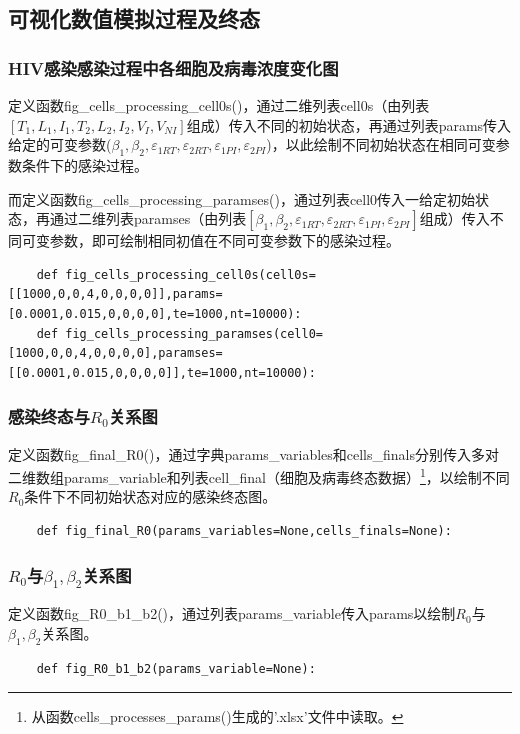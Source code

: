 \documentclass{ctexart}
\begin{document}
\subsection{可视化数值模拟过程及终态}
\subsubsection{HIV感染感染过程中各细胞及病毒浓度变化图}
定义函数fig\_cells\_processing\_cell0s()，通过二维列表cell0s（由列表$[T_{1},L_{1},I_{1},T_{2},L_{2},I_{2},V_{I},V_{NI}]$组成）传入不同的初始状态，再通过列表params传入给定的可变参数($\beta_{1},\beta_{2},\varepsilon _{1RT},\varepsilon _{2RT},\varepsilon _{1PI},\varepsilon _{2PI}$)，以此绘制不同初始状态在相同可变参数条件下的感染过程。

而定义函数fig\_cells\_processing\_paramses()，通过列表cell0传入一给定初始状态，再通过二维列表paramses（由列表$[\beta_{1},\beta_{2},\varepsilon _{1RT},\varepsilon _{2RT},\varepsilon _{1PI},\varepsilon _{2PI}]$组成）传入不同可变参数，即可绘制相同初值在不同可变参数下的感染过程。
\begin{lstlisting}
    def fig_cells_processing_cell0s(cell0s=[[1000,0,0,4,0,0,0,0]],params=[0.0001,0.015,0,0,0,0],te=1000,nt=10000):
    def fig_cells_processing_paramses(cell0=[1000,0,0,4,0,0,0,0],paramses=[[0.0001,0.015,0,0,0,0]],te=1000,nt=10000):
\end{lstlisting}

\subsubsection{感染终态与$R_{0}$关系图}
定义函数fig\_final\_R0()，通过字典params\_variables和cells\_finals分别传入多对二维数组params\_variable和列表cell\_final（细胞及病毒终态数据）\footnote{从函数cells\_processes\_params()生成的'.xlsx'文件中读取。}，以绘制不同$R_{0}$条件下不同初始状态对应的感染终态图。
\begin{lstlisting}
    def fig_final_R0(params_variables=None,cells_finals=None):
\end{lstlisting}

\subsubsection{$R_{0}$与$\beta_{1},\beta_{2}$关系图}
定义函数fig\_R0\_b1\_b2()，通过列表params\_variable传入params以绘制$R_{0}$与$\beta_{1},\beta_{2}$关系图。
\begin{lstlisting}
    def fig_R0_b1_b2(params_variable=None):
\end{lstlisting}
\end{document}
